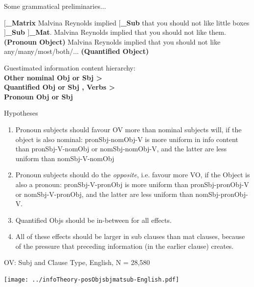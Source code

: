 \documentclass[hyperref={pdfpagelabels=false}]{beamer}
\begin{document}
\begin{frame}{Some grammatical preliminaries...}
\begin{exe}
	\ex \textbf{$[$_{Matrix}} Malvina Reynolds implied \textbf{$[$_{Sub}} that you should not like little boxes \textbf{$]$_{Sub} $]$_{Mat}}.
	\ex Malvina Reynolds implied that you should not like them. \textbf{(Pronoun Object)}
	\ex Malvina Reynolds implied that you should not like any/many/most/both/... \textbf{(Quantified Object)}
\end{exe}
\begin{center}
	Guestimated information content hierarchy:\\
	\textbf{Other nominal Obj or Sbj > \\Quantified Obj or Sbj , Verbs > \\Pronoun Obj or Sbj} 
\end{center}
\end{frame}

\begin{frame}{Hypotheses}
\begin{enumerate}
	\item Pronoun subjects should favour OV more than nominal subjects will, if the object is also nominal: pronSbj-nomObj-V is more uniform in info content than pronSbj-V-nomObj or nomSbj-nomObj-V, and the latter are less uniform than nomSbj-V-nomObj
	\item Pronoun subjects should do the \textsl{opposite}, i.e. favour more VO, if the Object is also a pronoun: pronSbj-V-pronObj is more uniform than pronSbj-pronObj-V or nomSbj-V-pronObj, and the latter are less uniform than nomSbj-pronObj-V.
	\item Quantified Objs should be in-between for all effects.
	\item All of these effects should be larger in sub clauses than mat clauses, because of the pressure that preceding information (in the earlier clause) creates.
\end{enumerate}
\end{frame}


\begin{frame}{OV: Subj and Clause Type, English, N = 28,580} 
\nocite{ycoe,ppcme24 ,ppceme,ppcmbe2}

\texttt{[image: ../infoTheory-posObjsbjmatsub-English.pdf]}

\end{frame}
\end{document}

